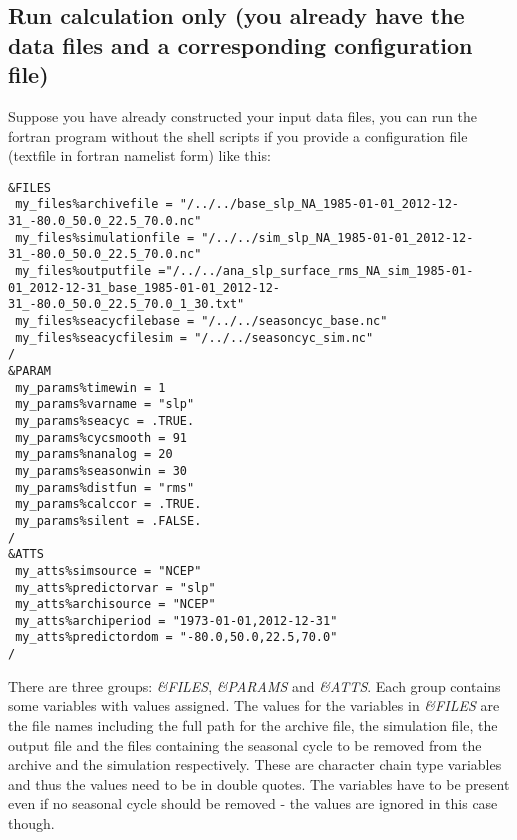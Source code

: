 \documentclass[11p,a4paper]{article}
\begin{document}
\subsection{Run calculation only (you already have the data files and a corresponding configuration file)}
Suppose you have already constructed your input data files, you can run the fortran program without the shell scripts if you provide a configuration file (textfile in fortran namelist form) like this:
\begin{verbatim}
&FILES
 my_files%archivefile = "/../../base_slp_NA_1985-01-01_2012-12-31_-80.0_50.0_22.5_70.0.nc"
 my_files%simulationfile = "/../../sim_slp_NA_1985-01-01_2012-12-31_-80.0_50.0_22.5_70.0.nc"
 my_files%outputfile ="/../../ana_slp_surface_rms_NA_sim_1985-01-01_2012-12-31_base_1985-01-01_2012-12-31_-80.0_50.0_22.5_70.0_1_30.txt"
 my_files%seacycfilebase = "/../../seasoncyc_base.nc"
 my_files%seacycfilesim = "/../../seasoncyc_sim.nc"
/
&PARAM
 my_params%timewin = 1
 my_params%varname = "slp"
 my_params%seacyc = .TRUE.
 my_params%cycsmooth = 91
 my_params%nanalog = 20
 my_params%seasonwin = 30
 my_params%distfun = "rms"
 my_params%calccor = .TRUE.
 my_params%silent = .FALSE.
/
&ATTS
 my_atts%simsource = "NCEP"
 my_atts%predictorvar = "slp"
 my_atts%archisource = "NCEP"
 my_atts%archiperiod = "1973-01-01,2012-12-31"
 my_atts%predictordom = "-80.0,50.0,22.5,70.0"
/
\end{verbatim}
There are three groups: \textit{\&FILES}, \textit{\&PARAMS} and \textit{\&ATTS}. Each group contains some variables with values assigned. The values for the variables in \textit{\&FILES} are the file names including the full path for the archive file, the simulation file, the output file and the files containing the seasonal cycle to be removed from the archive and the  simulation respectively. These are character chain type variables and thus the values need to be in double quotes. The variables have to be present even if no seasonal cycle should be removed - the values are ignored in this case though.
\end{document}
